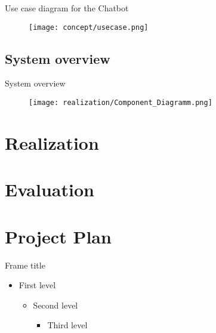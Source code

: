 \begin{frame}{Use case diagram for the Chatbot}
  \begin{figure}
    \centering
    \texttt{[image: concept/usecase.png]}

  \end{figure}
\end{frame}

\subsection{System overview}

\begin{frame}{System overview}
  \begin{figure}
    \centering
    \texttt{[image: realization/Component\_Diagramm.png]}

    \label{fig:sytsemOverview}
  \end{figure}
\end{frame}

\section{Realization}



\section{Evaluation}
\section{Project Plan}
\begin{frame}{Frame title}
  \begin{itemize}
    \item First level
          \begin{itemize}
            \item Second level
                  \begin{itemize}
                    \item Third level
                  \end{itemize}
          \end{itemize}
  \end{itemize}
\end{frame}


